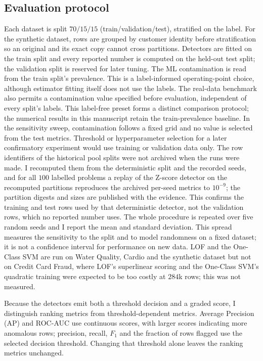 \documentclass[conference]{IEEEtran}
\begin{document}
\subsection{Evaluation protocol}
\label{sec:protocol}
Each dataset is split $70/15/15$ (train/validation/test), stratified on
the label. For the synthetic dataset, rows are grouped by customer identity
before stratification so an original and its exact copy cannot cross
partitions. Detectors are fitted on the train split and every reported
number is computed on the held-out test split; the validation split is
reserved for later tuning. The ML contamination is read from the train
split's prevalence. This is a label-informed operating-point choice,
although estimator fitting itself does not use the labels. The real-data
benchmark also permits a contamination value specified before evaluation,
independent of every split's labels. This label-free preset forms a distinct
comparison protocol; the numerical results in this manuscript retain the
train-prevalence baseline. In the sensitivity sweep, contamination follows a
fixed grid and no value is selected from the test metrics. Threshold or
hyperparameter selection for a later confirmatory experiment would use
training or validation data only. The row identifiers of the
historical pool splits were not archived when the runs were made. I recomputed them from the
deterministic split and the recorded seeds, and for all $100$ labelled problems a replay of the
Z-score detector on the recomputed partitions reproduces the archived per-seed metrics
to $10^{-9}$; the partition digests and sizes are published with the evidence. This confirms the
training and test rows used by that deterministic detector, not the validation rows, which no
reported number uses. The whole
procedure is repeated over five random
seeds and I report the mean and standard deviation. This spread measures
the sensitivity to the split and to model randomness on a fixed dataset; it
is not a confidence interval for performance on new data. LOF and the
One-Class SVM are run on Water Quality, Cardio and the synthetic dataset
but not on Credit Card Fraud, where LOF's superlinear scoring and the
One-Class SVM's quadratic training were expected to be too costly at
$284$k rows; this was not measured.

Because the detectors emit both a threshold decision and a graded score,
I distinguish ranking metrics from threshold-dependent metrics. Average
Precision (AP) and ROC-AUC use continuous scores, with larger scores indicating
more anomalous rows; precision, recall, $F_1$ and the fraction of rows flagged
use the selected decision threshold. Changing that threshold alone leaves the
ranking metrics unchanged.
\end{document}
